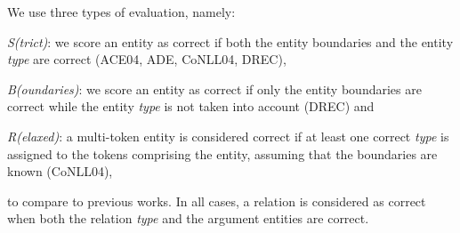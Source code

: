 \documentclass[11pt,a4paper]{article}
\begin{document}
We use three types of evaluation, namely: 
\begin{enumerate*}[label=(\roman*)]
\item \emph{S(trict)}: we score an entity as correct if both the entity boundaries and the entity \emph{type} are correct (ACE04, ADE, CoNLL04, DREC),
\item \emph{B(oundaries)}: we score an entity as correct if only the entity boundaries are correct while the entity \emph{type} is not taken into account (DREC) and
\item \emph{R(elaxed)}: a multi-token entity is considered correct if
at least one correct \emph{type} is assigned to the tokens comprising the entity, assuming that the boundaries are known (CoNLL04),
\end{enumerate*}
to compare to previous works. In all cases, a relation is considered as correct when both the relation \emph{type} and the argument entities are correct.
\end{document}
